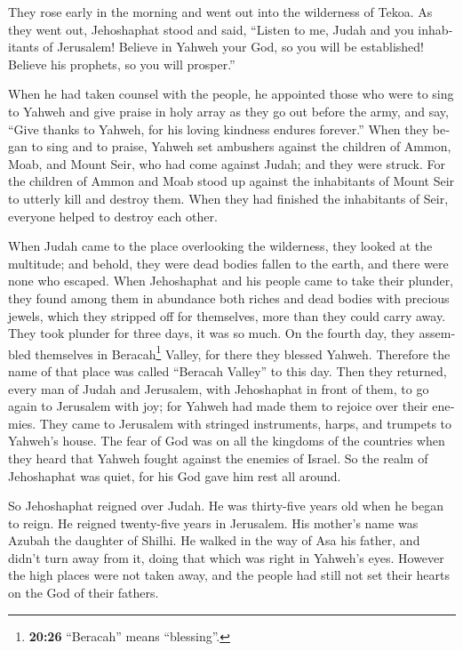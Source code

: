 \begin{paracol}{2}
\begin{otherlanguage}{english}
 They rose early in the morning and went out into the
wilderness of Tekoa. As they went out, Jehoshaphat stood and said,
``Listen to me, Judah and you inhabitants of Jerusalem! Believe in
Yahweh your God, so you will be established! Believe his prophets, so
you will prosper.''

 When he had taken counsel with the people, he appointed
those who were to sing to Yahweh and give praise in holy array as they
go out before the army, and say, ``Give thanks to Yahweh, for his loving
kindness endures forever.''  When they began to sing and
to praise, Yahweh set ambushers against the children of Ammon, Moab, and
Mount Seir, who had come against Judah; and they were struck.
 For the children of Ammon and Moab stood up against the
inhabitants of Mount Seir to utterly kill and destroy them. When they
had finished the inhabitants of Seir, everyone helped to destroy each
other.

 When Judah came to the place overlooking the wilderness,
they looked at the multitude; and behold, they were dead bodies fallen
to the earth, and there were none who escaped.  When
Jehoshaphat and his people came to take their plunder, they found among
them in abundance both riches and dead bodies with precious jewels,
which they stripped off for themselves, more than they could carry away.
They took plunder for three days, it was so much.  On the
fourth day, they assembled themselves in Beracah\footnote{\textbf{20:26}
  ``Beracah'' means ``blessing''.} Valley, for there they blessed
Yahweh. Therefore the name of that place was called ``Beracah Valley''
to this day.  Then they returned, every man of Judah and
Jerusalem, with Jehoshaphat in front of them, to go again to Jerusalem
with joy; for Yahweh had made them to rejoice over their enemies.
 They came to Jerusalem with stringed instruments, harps,
and trumpets to Yahweh's house.  The fear of God was on
all the kingdoms of the countries when they heard that Yahweh fought
against the enemies of Israel.  So the realm of
Jehoshaphat was quiet, for his God gave him rest all around.

 So Jehoshaphat reigned over Judah. He was thirty-five
years old when he began to reign. He reigned twenty-five years in
Jerusalem. His mother's name was Azubah the daughter of Shilhi.
 He walked in the way of Asa his father, and didn't turn
away from it, doing that which was right in Yahweh's eyes.
 However the high places were not taken away, and the
people had still not set their hearts on the God of their fathers.


\end{otherlanguage}
\end{paracol}
